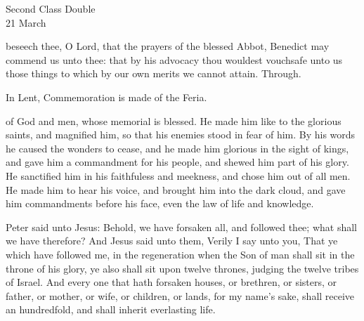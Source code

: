 \begin{inhead}
    {Second Class Double\\
21 March}
\end{inhead}

\collect
{} beseech thee, O Lord, that the prayers of the blessed Abbot, Benedict may commend us unto thee: that by his advocacy thou wouldest vouchsafe unto us those things to which by our own merits we cannot attain. Through.
\begin{rubric}
    In Lent, Commemoration is made of the Feria.
\end{rubric}
 of God and men, whose memorial is blessed. He made him like to the glorious saints, and magnified him, so that his enemies stood in fear of him. By his words he caused the wonders to cease, and he made him glorious in the sight of kings, and gave him a commandment for his people, and shewed him part of his glory. He sanctified him in his faithfuless and meekness, and chose him out of all men. He made him to hear his voice, and brought him into the dark cloud, and gave him commandments before his face, even the law of life and knowledge.


 Peter said unto Jesus: Behold, we have forsaken all, and followed thee; what shall we have therefore? And Jesus said unto them, Verily I say unto you, That ye which have followed me, in the regeneration when the Son of man shall sit in the throne of his glory, ye also shall sit upon twelve thrones, judging the twelve tribes of Israel. And every one that hath forsaken houses, or brethren, or sisters, or father, or mother, or wife, or children, or lands, for my name's sake, shall receive an hundredfold, and shall inherit everlasting life.

